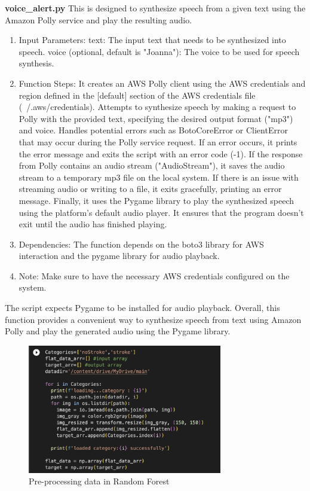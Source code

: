 \textbf{voice\_alert.py}
This is designed to synthesize speech from a given text using the Amazon Polly service and play the resulting audio.

\begin{enumerate}
    \item Input Parameters:
    text: The input text that needs to be synthesized into speech.
    voice (optional, default is "Joanna"): The voice to be used for speech synthesis.
    \item Function Steps:
    It creates an AWS Polly client using the AWS credentials and region defined in the [default] section of the AWS credentials file (~/.aws/credentials).
    Attempts to synthesize speech by making a request to Polly with the provided text, specifying the desired output format ("mp3") and voice.
    Handles potential errors such as BotoCoreError or ClientError that may occur during the Polly service request. If an error occurs, it prints the error message and exits the script with an error code (-1).
    If the response from Polly contains an audio stream ("AudioStream"), it saves the audio stream to a temporary mp3 file on the local system.
    If there is an issue with streaming audio or writing to a file, it exits gracefully, printing an error message.
    Finally, it uses the Pygame library to play the synthesized speech using the platform's default audio player. It ensures that the program doesn't exit until the audio has finished playing.
    \item Dependencies:
    The function depends on the boto3 library for AWS interaction and the pygame library for audio playback.
    \item Note:
    Make sure to have the necessary AWS credentials configured on the system.
\end{enumerate}

The script expects Pygame to be installed for audio playback.
Overall, this function provides a convenient way to synthesize speech from text using Amazon Polly and play the generated audio using the Pygame library.

\begin{figure}[h]
    \centering
    \includegraphics[width=8.5cm]{images/rf_data.png}
    \caption{Pre-processing data in Random Forest}
    \label{fig:enter-label}
\end{figure}

